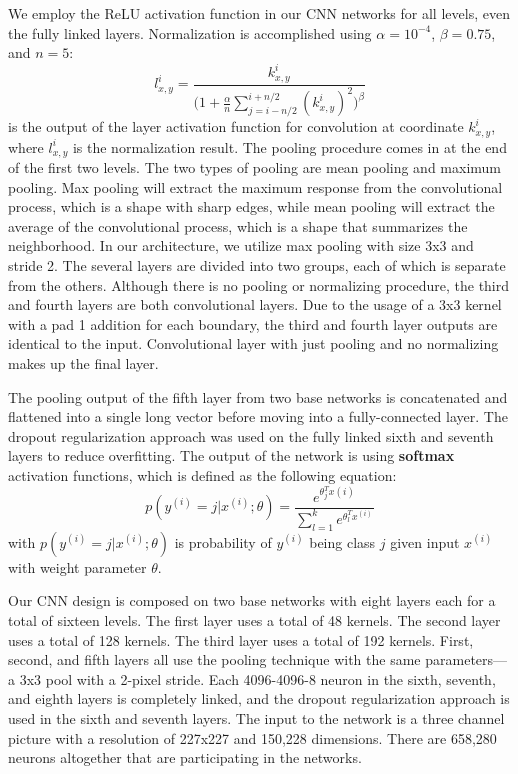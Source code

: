 \documentclass[letterpaper, 10 pt, conference]{ieeeconf}  %
\begin{document}
We employ the ReLU activation function in our CNN networks for all levels, even the fully linked layers. Normalization is accomplished using $\alpha = 10^{-4}$, $\beta = 0.75$, and $n=5$:
$$l^i_{x,y} = \frac{k^i_{x,y}}{\big(1+\frac{\alpha}{n} \sum^{i+n/2}_{j=i-n/2} (k^i_{x,y})^2\big)^{\beta}}$$
is the output of the layer activation function for convolution at coordinate $k^i_{x,y}$, where $l^i_{x,y}$ is the normalization result. The pooling procedure comes in at the end of the first two levels. The two types of pooling are mean pooling and maximum pooling. Max pooling will extract the maximum response from the convolutional process, which is a shape with sharp edges, while mean pooling will extract the average of the convolutional process, which is a shape that summarizes the neighborhood. In our architecture, we utilize max pooling with size 3x3 and stride 2. The several layers are divided into two groups, each of which is separate from the others. Although there is no pooling or normalizing procedure, the third and fourth layers are both convolutional layers. Due to the usage of a 3x3 kernel with a pad 1 addition for each boundary, the third and fourth layer outputs are identical to the input. Convolutional layer with just pooling and no normalizing makes up the final layer. \par
The pooling output of the fifth layer from two base networks is concatenated and flattened into a single long vector before moving into a fully-connected layer. The dropout regularization approach was used on the fully linked sixth and seventh layers to reduce overfitting. The output of the network is using {\bf softmax} activation functions, which is defined as the following equation:
$$p(y^{(i)} = j|x^{(i)}; \theta) = \frac{e^{\theta^{T}_j x(i)}}{\sum^k_{l=1} e^{\theta^T_l x^{(i)}}}$$
with $p(y^{(i)} = j|x^{(i)}; \theta)$ is probability of $y^{(i)}$ being class $j$ given input $x^{(i)}$ with weight parameter $\theta$. \par \par
Our CNN design is composed on two base networks with eight layers each for a total of sixteen levels. The first layer uses a total of 48 kernels. The second layer uses a total of 128 kernels. The third layer uses a total of 192 kernels. First, second, and fifth layers all use the pooling technique with the same parameters—a 3x3 pool with a 2-pixel stride. Each 4096-4096-8 neuron in the sixth, seventh, and eighth layers is completely linked, and the dropout regularization approach is used in the sixth and seventh layers. The input to the network is a three channel picture with a resolution of 227x227 and 150,228 dimensions. There are 658,280 neurons altogether that are participating in the networks. \par
\end{document}
